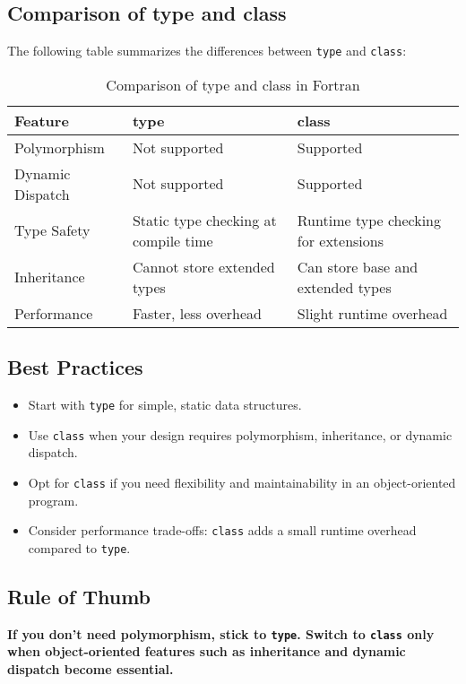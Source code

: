 \subsection{Comparison of type and class}
The following table summarizes the differences between \texttt{type} and \texttt{class}:

\begin{table}[htbp]
\centering
\begin{tabular}{l l l}
\hline
\textbf{Feature}       & \textbf{type}                              & \textbf{class}                            \\ \hline
Polymorphism           & Not supported                             & Supported                                 \\
Dynamic Dispatch       & Not supported                             & Supported                                 \\
Type Safety            & Static type checking at compile time      & Runtime type checking for extensions      \\
Inheritance            & Cannot store extended types               & Can store base and extended types         \\
Performance            & Faster, less overhead                     & Slight runtime overhead                   \\
\hline
\end{tabular}
\caption{Comparison of type and class in Fortran}
\label{tab:type_class_comparison}
\end{table}

\subsection{Best Practices}
\begin{itemize}
    \item Start with \texttt{type} for simple, static data structures.
    \item Use \texttt{class} when your design requires polymorphism, inheritance, or dynamic dispatch.
    \item Opt for \texttt{class} if you need flexibility and maintainability in an object-oriented program.
    \item Consider performance trade-offs: \texttt{class} adds a small runtime overhead compared to \texttt{type}.
\end{itemize}

\subsection{Rule of Thumb}
\textbf{If you don’t need polymorphism, stick to \texttt{type}. Switch to \texttt{class} only when object-oriented features such as inheritance and dynamic dispatch become essential.}

